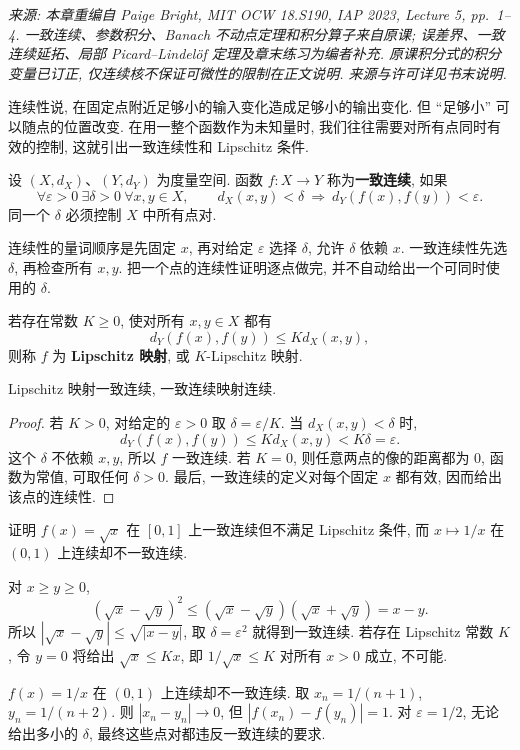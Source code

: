 \label{ch:fixed}

\emph{来源: 本章重编自 Paige Bright, MIT OCW 18.S190, IAP 2023, Lecture 5, pp.\ 1--4. 一致连续、参数积分、Banach 不动点定理和积分算子来自原课; 误差界、一致连续延拓、局部 Picard--Lindel\"of 定理及章末练习为编者补充. 原课积分式的积分变量已订正, 仅连续核不保证可微性的限制在正文说明. 来源与许可详见书末说明.}


连续性说, 在固定点附近足够小的输入变化造成足够小的输出变化. 但 ``足够小'' 可以随点的位置改变. 在用一整个函数作为未知量时, 我们往往需要对所有点同时有效的控制, 这就引出一致连续性和 Lipschitz 条件.

\begin{definition}\label{def:uniform-continuity}
设 $(X,d_X)$、$(Y,d_Y)$ 为度量空间. 函数 $f:X\to Y$ 称为\textbf{一致连续}, 如果
\[
\forall\varepsilon>0\ \exists\delta>0\ \forall x,y\in X,
\qquad d_X(x,y)<\delta\ \Longrightarrow\ d_Y(f(x),f(y))<\varepsilon.
\]
同一个 $\delta$ 必须控制 $X$ 中所有点对.
\end{definition}

连续性的量词顺序是先固定 $x$, 再对给定 $\varepsilon$ 选择 $\delta$, 允许 $\delta$ 依赖 $x$. 一致连续性先选 $\delta$, 再检查所有 $x,y$. 把一个点的连续性证明逐点做完, 并不自动给出一个可同时使用的 $\delta$.

\begin{definition}\label{def:lipschitz}
若存在常数 $K\geq0$, 使对所有 $x,y\in X$ 都有
\[
d_Y(f(x),f(y))\leq Kd_X(x,y),
\]
则称 $f$ 为 \textbf{Lipschitz 映射}, 或 $K$-Lipschitz 映射.
\end{definition}

\begin{proposition}\label{prop:lipschitz-uniform}
Lipschitz 映射一致连续, 一致连续映射连续.
\end{proposition}
\begin{proof}
若 $K>0$, 对给定的 $\varepsilon>0$ 取 $\delta=\varepsilon/K$. 当 $d_X(x,y)<\delta$ 时,
\[
d_Y(f(x),f(y))\leq Kd_X(x,y)<K\delta=\varepsilon.
\]
这个 $\delta$ 不依赖 $x,y$, 所以 $f$ 一致连续. 若 $K=0$, 则任意两点的像的距离都为 $0$, 函数为常值, 可取任何 $\delta>0$. 最后, 一致连续的定义对每个固定 $x$ 都有效, 因而给出该点的连续性.
\end{proof}

\begin{example}
证明 $f(x)=\sqrt{x}$ 在 $[0,1]$ 上一致连续但不满足 Lipschitz 条件, 而 $x\mapsto1/x$ 在 $(0,1)$ 上连续却不一致连续.
\end{example}
\begin{solution}
对 $x\geq y\geq0$,
\[
(\sqrt{x}-\sqrt{y})^2
\leq(\sqrt{x}-\sqrt{y})(\sqrt{x}+\sqrt{y})=x-y.
\]
所以 $|\sqrt{x}-\sqrt{y}|\leq\sqrt{|x-y|}$, 取 $\delta=\varepsilon^2$ 就得到一致连续. 若存在 Lipschitz 常数 $K$, 令 $y=0$ 将给出 $\sqrt{x}\leq Kx$, 即 $1/\sqrt{x}\leq K$ 对所有 $x>0$ 成立, 不可能.

$f(x)=1/x$ 在 $(0,1)$ 上连续却不一致连续. 取 $x_n=1/(n+1)$, $y_n=1/(n+2)$. 则 $|x_n-y_n|\to0$, 但 $|f(x_n)-f(y_n)|=1$. 对 $\varepsilon=1/2$, 无论给出多小的 $\delta$, 最终这些点对都违反一致连续的要求.
\end{solution}

